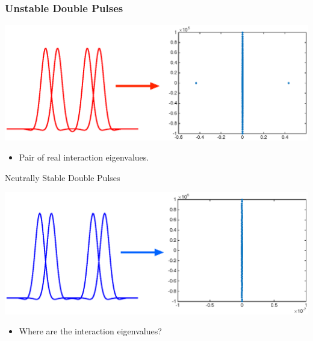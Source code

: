 \documentclass[16pt]{beamer}
\begin{document}
\begin{frame}
	\frametitle{Unstable Double Pulses}
	\begin{center}
		\includegraphics[width=1\linewidth]{images/doubleunstableeig}
	\end{center}
	\begin{itemize}
	\item Pair of real interaction eigenvalues.
	\end{itemize}
\end{frame}

\begin{frame}{Neutrally Stable Double Pulses}
	\begin{center}
		\includegraphics[width=1\linewidth]{images/doublestableeig}
	\end{center}
	\begin{itemize}
	\item Where are the interaction eigenvalues?
	\end{itemize}
\end{frame}
\end{document}
